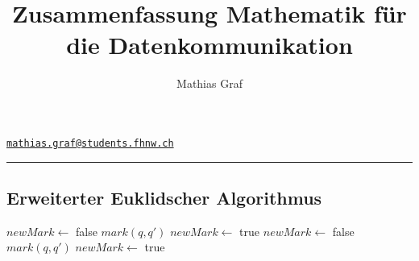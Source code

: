 \documentclass[a4paper, ngerman, landscape]{article}
\title{Zusammenfassung Mathematik für die Datenkommunikation}
\author{Mathias Graf}
\makeatletter
\def\email{\href{mailto:mathias.graf@students.fhnw.ch}{\texttt{mathias.graf@students.fhnw.ch}}}
\makeatother
\begin{document}
\makeatletter
{\Large \textbf{\@title}}
\hfill
{\@author}
\hfill
\email
\makeatother
\hrule

\begin{multicols*}{3}

\section*{Erweiterter Euklidscher Algorithmus}

\begin{algorithmic}
	\STATE  $newMark \leftarrow$ false
		\STATE $mark(q, q')$ 
		\STATE $newMark \leftarrow$ true
		\ENDIF
	\ENDFOR
		\STATE $newMark \leftarrow$ false
				\STATE $mark(q, q')$
				\STATE $newMark \leftarrow$ true
			\ENDIF
		\ENDFOR
	\ENDWHILE
\end{algorithmic}


\end{multicols*}
\end{document}
